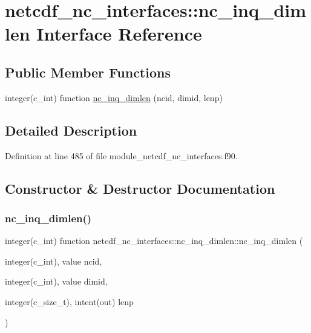 \hypertarget{interfacenetcdf__nc__interfaces_1_1nc__inq__dimlen}{}\section{netcdf\+\_\+nc\+\_\+interfaces\+:\+:nc\+\_\+inq\+\_\+dimlen Interface Reference}
\label{interfacenetcdf__nc__interfaces_1_1nc__inq__dimlen}
\subsection*{Public Member Functions}
\begin{DoxyCompactItemize}
\item 
integer(c\+\_\+int) function \hyperlink{interfacenetcdf__nc__interfaces_1_1nc__inq__dimlen_ad7461d42d1f1f9834d2978171d7028a1}{nc\+\_\+inq\+\_\+dimlen} (ncid, dimid, lenp)
\end{DoxyCompactItemize}


\subsection{Detailed Description}


Definition at line 485 of file module\+\_\+netcdf\+\_\+nc\+\_\+interfaces.\+f90.



\subsection{Constructor \& Destructor Documentation}
\mbox{\label{interfacenetcdf__nc__interfaces_1_1nc__inq__dimlen_ad7461d42d1f1f9834d2978171d7028a1}} 
\subsubsection{\texorpdfstring{nc\+\_\+inq\+\_\+dimlen()}{nc\_inq\_dimlen()}}
{\footnotesize\ttfamily integer(c\+\_\+int) function netcdf\+\_\+nc\+\_\+interfaces\+::nc\+\_\+inq\+\_\+dimlen\+::nc\+\_\+inq\+\_\+dimlen (\begin{DoxyParamCaption}\item[{integer(c\+\_\+int), value}]{ncid,  }\item[{integer(c\+\_\+int), value}]{dimid,  }\item[{integer(c\+\_\+size\+\_\+t), intent(out)}]{lenp }\end{DoxyParamCaption})}



